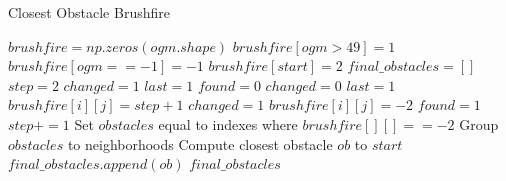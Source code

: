 \begin{algorithm}[H]
\caption{Closest Obstacle Brushfire}
\label{alg:closestObstacleBrushfire}
\begin{algorithmic}[1]
        \State $brushfire = np.zeros(ogm.shape)$
        \State $brushfire[ogm > 49] = 1$
        \State $brushfire[ogm == -1] = -1$
        \State $brushfire[start] = 2$
        \State $final\_obstacles = []$
        \State $step = 2$
        \State $changed = 1$
        \State $last = 1$
        \State $found = 0$
            \State $changed = 0$
                \State $last = 1$
            \EndIf
                        \State $brushfire[i][j] = step + 1$
                        \State $changed = 1$
                        \State $brushfire[i][j] = -2$
                        \State $found = 1$
                    \EndIf
                \EndFor
            \EndFor
            \State $step += 1$
        \EndWhile
        \State Set $obstacles$ equal to indexes where $brushfire[][] == -2$
        \State Group $obstacles$ to neighborhoods
            \State Compute closest obstacle $ob$ to $start$
            \State $final\_obstacles.append(ob)$
        \EndFor
        \State \Return $final\_obstacles$
            
\end{algorithmic}
\end{algorithm}




